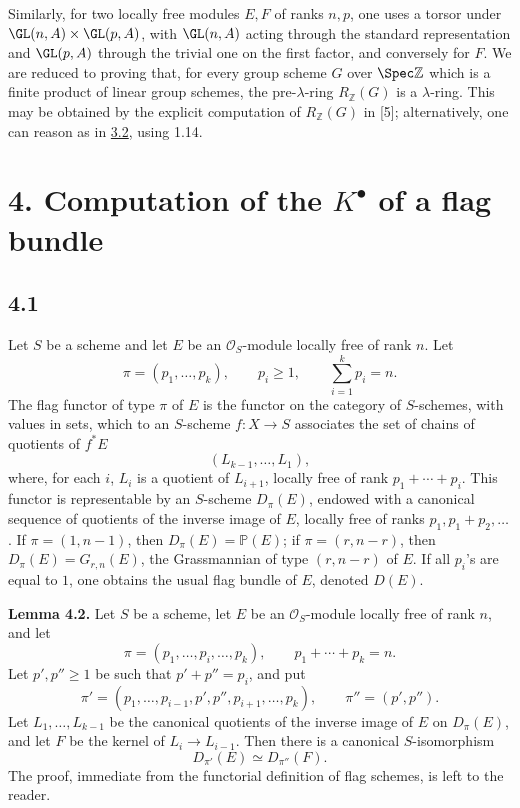 Similarly, for two locally free modules \(E,F\) of ranks \(n,p\), one uses a torsor under \(\GL(n,A)\times\GL(p,A)\), with \(\GL(n,A)\) acting through the standard representation and \(\GL(p,A)\) through the trivial one on the first factor, and conversely for \(F\). We are reduced to proving that, for every group scheme \(G\) over \(\Spec\mathbb Z\) which is a finite product of linear group schemes, the pre-\(\lambda\)-ring \(R_{\mathbb Z}(G)\) is a \(\lambda\)-ring. This may be obtained by the explicit computation of \(R_{\mathbb Z}(G)\) in [5]; alternatively, one can reason as in \hyperlink{sga6.e06.thm.3-2}{3.2}, using 1.14.

\section*{4. Computation of the \(K^\bullet\) of a flag bundle}

\subsection*{4.1}
Let \(S\) be a scheme and let \(E\) be an \(\mathcal O_S\)-module locally free of rank \(n\). Let
\[
  \pi=(p_1,\ldots,p_k),\qquad p_i\geq 1,
  \qquad \sum_{i=1}^k p_i=n.
\]
The flag functor of type \(\pi\) of \(E\) is the functor on the category of \(S\)-schemes, with values in sets, which to an \(S\)-scheme \(f:X\to S\) associates the set of chains of quotients of \(f^*E\)
\[
  (L_{k-1},\ldots,L_1),
\]
where, for each \(i\), \(L_i\) is a quotient of \(L_{i+1}\), locally free of rank \(p_1+\cdots+p_i\). This functor is representable by an \(S\)-scheme \(D_\pi(E)\), endowed with a canonical sequence of quotients of the inverse image of \(E\), locally free of ranks \(p_1,p_1+p_2,\ldots\). If \(\pi=(1,n-1)\), then \(D_\pi(E)=\mathbb P(E)\); if \(\pi=(r,n-r)\), then \(D_\pi(E)=G_{r,n}(E)\), the Grassmannian of type \((r,n-r)\) of \(E\). If all \(p_i\)'s are equal to \(1\), one obtains the usual flag bundle of \(E\), denoted \(D(E)\).

\textbf{Lemma 4.2.} Let \(S\) be a scheme, let \(E\) be an \(\mathcal O_S\)-module locally free of rank \(n\), and let
\[
  \pi=(p_1,\ldots,p_i,\ldots,p_k),\qquad p_1+\cdots+p_k=n.
\]
Let \(p',p''\geq 1\) be such that \(p'+p''=p_i\), and put
\[
  \pi'=(p_1,\ldots,p_{i-1},p',p'',p_{i+1},\ldots,p_k),
  \qquad \pi''=(p',p'').
\]
Let \(L_1,\ldots,L_{k-1}\) be the canonical quotients of the inverse image of \(E\) on \(D_\pi(E)\), and let \(F\) be the kernel of \(L_i\to L_{i-1}\). Then there is a canonical \(S\)-isomorphism
\[
  D_{\pi'}(E)\simeq D_{\pi''}(F).
\]
The proof, immediate from the functorial definition of flag schemes, is left to the reader.

